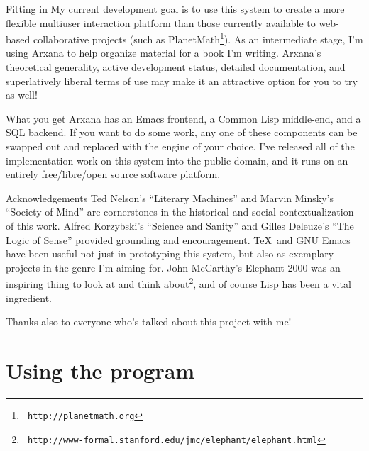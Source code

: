 \begin{notate}{Fitting in}
My current development goal is to use this system to
create a more flexible multiuser interaction platform than
those currently available to web-based collaborative
projects (such as PlanetMath\footnote{{\tt
    http://planetmath.org}}).  As an intermediate stage,
I'm using Arxana to help organize material for a book I'm
writing.  Arxana's theoretical generality, active
development status, detailed documentation, and
superlatively liberal terms of use may make it an
attractive option for you to try as well!
\end{notate}

\begin{notate}{What you get}
Arxana has an Emacs frontend, a Common Lisp middle-end,
and a SQL backend.  If you want to do some work, any one
of these components can be swapped out and replaced with
the engine of your choice.  I've released all of the
implementation work on this system into the public domain,
and it runs on an entirely free/libre/open source software
platform.
\end{notate}

\begin{notate}{Acknowledgements}
Ted Nelson's ``Literary Machines'' and Marvin Minsky's
``Society of Mind'' are cornerstones in the historical and
social contextualization of this work.  Alfred Korzybski's
``Science and Sanity'' and Gilles Deleuze's ``The Logic of
Sense'' provided grounding and encouragement.  \TeX\ and
GNU Emacs have been useful not just in prototyping this
system, but also as exemplary projects in the genre I'm
aiming for.  John McCarthy's Elephant 2000 was an
inspiring thing to look at and think about\footnote{{\tt
    http://www-formal.stanford.edu/jmc/elephant/elephant.html}}, and of course Lisp has been a vital ingredient.

Thanks also to everyone who's talked about this project
with me!
\end{notate}

\section{Using the program}

